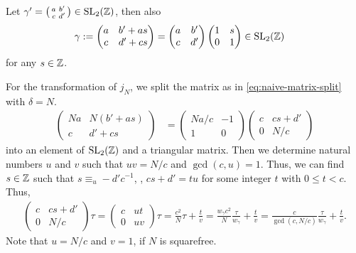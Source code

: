 \documentclass{article}
\begin{document}
Let
$\gamma' = \bigl(
\begin{smallmatrix}
  a & b'\\
  c & d'
\end{smallmatrix}
\bigr) \in \SL2Z$, then also
\begin{align*}
  \gamma
  &:=
    \begin{pmatrix}
      a & b' + as\\
      c & d' + cs
    \end{pmatrix}
  =
    \begin{pmatrix}
      a & b'\\
      c & d'
    \end{pmatrix}
    \begin{pmatrix}
      1 & s\\
      0 & 1
    \end{pmatrix}
    \in \SL2Z
\end{align*}
for any $s\in\mathbb{Z}$.

For the transformation of $j_N$, we split the matrix as in
\eqref{eq:naive-matrix-split} with $\delta=N$.
\begin{align*}
  \begin{pmatrix}
    N a & N(b' + as)\\
    c & d' + cs
  \end{pmatrix}
      &=
  \begin{pmatrix}
    N a/c & -1\\
    1     &  0
  \end{pmatrix}
  \begin{pmatrix}
    c & cs+d'\\
    0 & N/c
  \end{pmatrix}
\end{align*}
into an element of $\SL2Z$ and a triangular matrix.
%
Then we determine natural numbers $u$ and $v$ such that $u v = N/c$
and $\gcd(c, u)=1$. Thus, we can find $s \in \mathbb{Z}$ such that
$s \equiv_u -d'c^{-1}$, \ie, $cs + d' = tu$ for some integer
$t$ with $0\le t<c$.
%
Thus,
\begin{gather*}
  \begin{pmatrix}
    c & cs+d'\\
    0 & N/c
  \end{pmatrix} \tau
  =
  \begin{pmatrix}
    c & u t\\
    0 & u v
  \end{pmatrix} \tau
  =
  \frac{c^2}{N} \tau + \frac{t}{v}
  =
 \frac{w_\gamma c^2}{N} \frac{\tau}{w_\gamma} + \frac{t}{v}
  =
 \frac{c}{\gcd(c,N/c)} \frac{\tau}{w_\gamma} + \frac{t}{v}
  .
\end{gather*}
Note that $u=N/c$ and $v=1$, if $N$ is squarefree.
\end{document}
